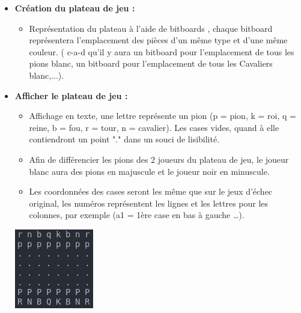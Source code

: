\documentclass{article}
\begin{document}
\begin{itemize}

\subsection{Liste des besoins fonctionnels}
\medskip

    \item \textbf{Création du plateau de jeu : }
    \medskip
    \begin{itemize}
        \item Représentation du plateau à l'aide de bitboards \cite{Bitboards}, chaque bitboard représentera l'emplacement des pièces d'un même type et d'une même couleur. ( c-a-d qu'il y aura un bitboard pour l'emplacement de tous les pions blanc, un bitboard pour l'emplacement de tous les Cavaliers blanc,...).
    \end{itemize}
    \medskip
    \item \textbf{Afficher le plateau de jeu : }
    \medskip
    \begin{itemize}
        \item Affichage en texte, une lettre représente un pion (p = pion, k = roi, q = reine,
        b = fou, r = tour, n = cavalier).
        Les cases vides, quand à elle contiendront un point "." dans un souci de lisibilité.
        \item Afin de différencier les pions des 2 joueurs du plateau de jeu, le joueur blanc aura des pions en majuscule et le joueur noir en minuscule.
        \item Les coordonnées des cases seront les même que sur le jeux d'échec original, les numéros représentent les lignes et les lettres pour les colonnes, par exemple (a1 = 1ère case en bas à gauche \dots).
    \end{itemize}
    \centerline{\includegraphics[scale = 0.5]{img/echecs_title.png}}

\end{itemize}
\end{document}
